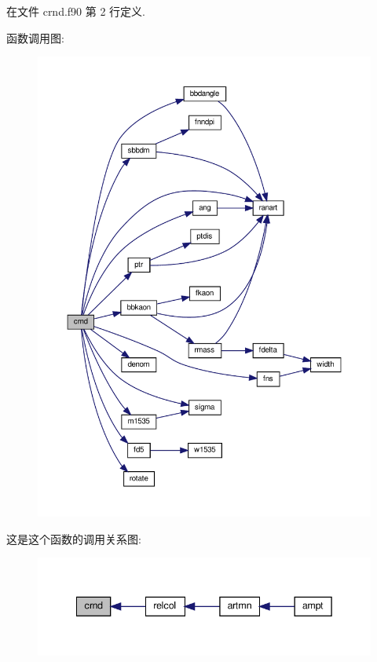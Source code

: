 在文件 crnd.\+f90 第 2 行定义.

函数调用图\+:
\nopagebreak
\begin{figure}[H]
\begin{center}
\leavevmode
\includegraphics[width=350pt]{crnd_8f90_ad43364065dc3cc3bbe0f9c5a2d4e2600_cgraph}
\end{center}
\end{figure}
这是这个函数的调用关系图\+:
\nopagebreak
\begin{figure}[H]
\begin{center}
\leavevmode
\includegraphics[width=342pt]{crnd_8f90_ad43364065dc3cc3bbe0f9c5a2d4e2600_icgraph}
\end{center}
\end{figure}
